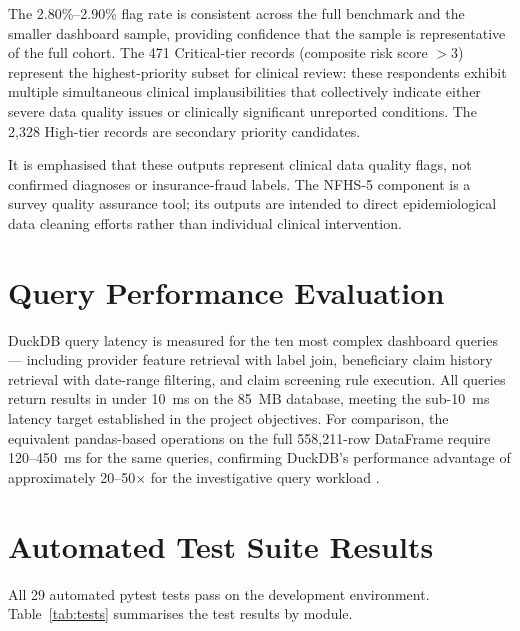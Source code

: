The 2.80\%--2.90\% flag rate is consistent across the full benchmark and the smaller dashboard sample, providing confidence that the sample is representative of the full cohort. The 471 Critical-tier records (composite risk score $> 3$) represent the highest-priority subset for clinical review: these respondents exhibit multiple simultaneous clinical implausibilities that collectively indicate either severe data quality issues or clinically significant unreported conditions. The 2,328 High-tier records are secondary priority candidates.

It is emphasised that these outputs represent clinical data quality flags, not confirmed diagnoses or insurance-fraud labels. The NFHS-5 component is a survey quality assurance tool; its outputs are intended to direct epidemiological data cleaning efforts rather than individual clinical intervention.

\section{Query Performance Evaluation}
\label{sec:query-perf}

DuckDB query latency is measured for the ten most complex dashboard queries --- including provider feature retrieval with label join, beneficiary claim history retrieval with date-range filtering, and claim screening rule execution. All queries return results in under 10~ms on the 85~MB database, meeting the sub-10~ms latency target established in the project objectives. For comparison, the equivalent pandas-based operations on the full 558,211-row DataFrame require 120--450~ms for the same queries, confirming DuckDB's performance advantage of approximately 20--50$\times$ for the investigative query workload \cite{b17}.

\section{Automated Test Suite Results}
\label{sec:test-results}

All 29 automated pytest tests pass on the development environment. Table~\ref{tab:tests} summarises the test results by module.

